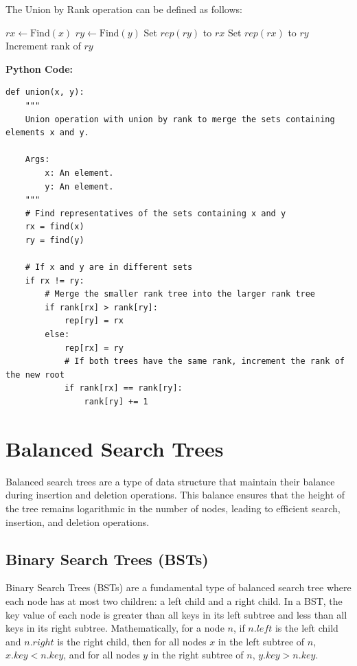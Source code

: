 \documentclass[12pt]{book} %
\begin{document}
The Union by Rank operation can be defined as follows:
\FloatBarrier
\begin{algorithm}[H]
\caption{Union(\(x, y\)) with Union by Rank}
\begin{algorithmic}[1]
    \State \(rx \gets \text{Find}(x)\)
    \State \(ry \gets \text{Find}(y)\)
            \State Set \(rep(ry)\) to \(rx\)
        \Else
            \State Set \(rep(rx)\) to \(ry\)
                \State Increment rank of \(ry\)
            \EndIf
        \EndIf
    \EndIf
\EndFunction
\end{algorithmic}
\end{algorithm}
\FloatBarrier
\textbf{Python Code:}
\FloatBarrier
\begin{lstlisting}
def union(x, y):
    """
    Union operation with union by rank to merge the sets containing elements x and y.
    
    Args:
        x: An element.
        y: An element.
    """
    # Find representatives of the sets containing x and y
    rx = find(x)
    ry = find(y)
    
    # If x and y are in different sets
    if rx != ry:
        # Merge the smaller rank tree into the larger rank tree
        if rank[rx] > rank[ry]:
            rep[ry] = rx
        else:
            rep[rx] = ry
            # If both trees have the same rank, increment the rank of the new root
            if rank[rx] == rank[ry]:
                rank[ry] += 1
\end{lstlisting}

\section{Balanced Search Trees}
Balanced search trees are a type of data structure that maintain their balance during insertion and deletion operations. This balance ensures that the height of the tree remains logarithmic in the number of nodes, leading to efficient search, insertion, and deletion operations.

\subsection{Binary Search Trees (BSTs)}
Binary Search Trees (BSTs) are a fundamental type of balanced search tree where each node has at most two children: a left child and a right child. In a BST, the key value of each node is greater than all keys in its left subtree and less than all keys in its right subtree. Mathematically, for a node \(n\), if \(n.left\) is the left child and \(n.right\) is the right child, then for all nodes \(x\) in the left subtree of \(n\), \(x.key < n.key\), and for all nodes \(y\) in the right subtree of \(n\), \(y.key > n.key\).
\end{document}

